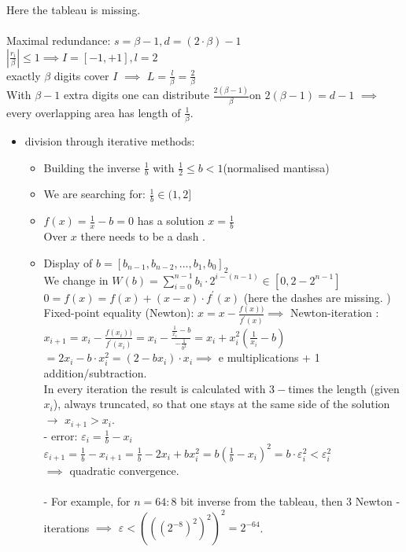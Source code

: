 Here the tableau is missing. \\
\\
Maximal redundance: $s=\beta-1, d=(2\cdot \beta)-1$\\
$|\frac{r_i}{\beta}|\le 1 \implies I=[-1,+1], l=2$ \\
exactly $\beta$ digits cover $I$ $\implies$ $L=\frac{l}{\beta}=\frac{2}{\beta}$ \\

With $\beta-1$ extra digits one can distribute $\frac{2(\beta-1)}{\beta}$on $2(\beta-1)=d-1$ $\implies$ every overlapping area has length of $\frac{1}{\beta}$.
\begin{itemize}
    \item division through iterative methods:
    \begin{itemize}
        \item Building the inverse $\frac{1}{b}$ with $\frac{1}{2}\le b<1 $(normalised mantissa)
        \item We are searching for: $\frac{1}{b}\in (1,2]$
        \item $f(x)=\frac{1}{x}-b=0$ has a solution $x=\frac{1}{b}$ \\
        Over $x$ there needs to be a dash .
       
        \item Display of $b=[b_{n-1},b_{n-2},...,b_1,b_0]_2$ \\
        We change in $W(b)=\sum_{i=0}^{n-1} b_i\cdot 2^{i-(n-1)} \in [0,2-2^{n-1}]$ \\
        $0=f(x)=f(x)+(x-x)\cdot f^\prime (x)$ (here the dashes are missing. ) \\
       
        Fixed-point equality (Newton):
        $x=x-\frac{f(x))}{f^\prime(x)}\implies$ Newton-iteration :\\
        $x_{i+1}=x_i-\frac{f(x_i))}{f^\prime(x_i)}=x_i-\frac{\frac{1}{x_i}-b}{-\frac{1}{b^2}}=x_i+x_i^2(\frac{1}{x_i}-b)$\\
        $=2x_i-b\cdot x_i^2=(2-bx_i)\cdot x_i\implies $ e multiplications + 1 addition/subtraction. \\
       
        In every iteration the result is calculated with $3-$times the length (given $x_i$), always truncated, so that one stays at the same side of the solution $\to$ $x_{i+1}>x_i$. \\
       
        - error: $\varepsilon_i=\frac{1}{b}-x_i$ \\
        $\varepsilon_{i+1}=\frac{1}{b}-x_{i+1}=\frac{1}{b}-2x_i+bx_i^2=b(\frac{1}{b}-x_i)^2=b\cdot \varepsilon_i^2<\varepsilon_i^2$ \\
        $\implies$ quadratic convergence. \\
        \\
        - For example, for $n=64: 8$ bit inverse from the tableau, then $3$ Newton -iterations $\implies$ $\varepsilon<(((2^{-8})^2)^2)^2=2^{-64}$.
    \end{itemize}
\end{itemize}

